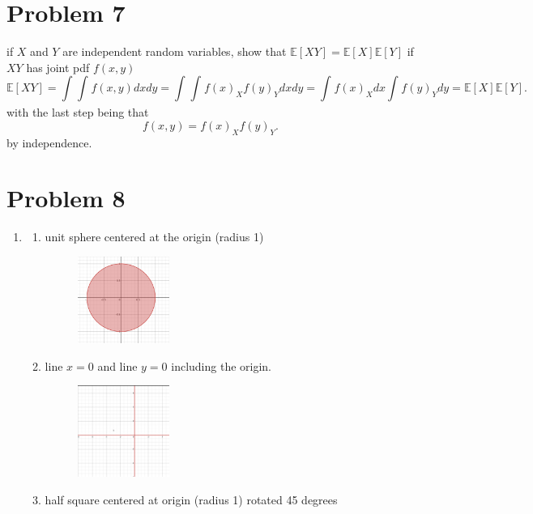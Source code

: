 \documentclass[11pt]{article}
\newcommand{\solution}[1]{{{\color{blue}{\bf Solution:} {#1}}}}
\begin{document}
\section{Problem 7}
if $X$ and $Y$ are independent random variables, show that $\mathbb{E}[XY] = \mathbb{E}[X] \mathbb{E}[Y]$
\solution{
   if $XY$ has joint pdf $f(x,y)$
   \[
       \mathbb{E}[XY] = \int_{}^{}\int_{}^{}f(x,y)dxdy = \int_{}^{}\int_{}^{}f(x)_Xf(y)_Ydxdy = \int_{}^{}f(x)_Xdx\int_{}^{}f(y)_Ydy = \mathbb{E}[X] \mathbb{E}[Y]
   .\] 
   with the last step being that
   \[
   f(x,y) = f(x)_X f(y)_Y
   .\] 
   by independence.
}
\section{Problem 8}
\solution{
    \begin{enumerate}
        \item 
        \begin{enumerate}
            \item unit sphere centered at the origin (radius 1)
                \begin{figure}[h]
                    \includegraphics[width=0.3\textwidth]{unit_sphere.png} 
                \end{figure}
            \item line $x=0$ and line $y=0$ including the origin.
                \begin{figure}[h]
                    \includegraphics[width=0.3\textwidth]{lines.png}                
                \end{figure}
            \item half square centered at origin (radius 1) rotated 45 degrees
                \begin{figure}[h]

\end{figure}
\end{enumerate}
\end{enumerate}}
\end{document}
